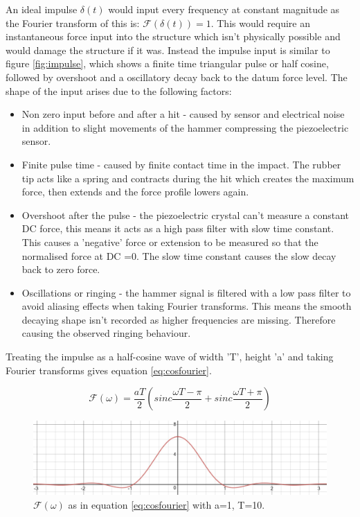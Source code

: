 \documentclass[twoside,onecolumn]{article}
\begin{document}
An ideal impulse $\delta(t)$ would input every frequency at constant magnitude as the Fourier transform of this is: $\mathcal{F}(\delta(t))=1$. This would require an instantaneous force input into the structure which isn't physically possible and would damage the structure if it was. Instead the impulse input is similar to figure \ref{fig:impulse}, which shows a finite time triangular pulse or half cosine, followed by overshoot and a oscillatory decay back to the datum force level. 
The shape of the input arises due to the following factors:
\begin{itemize}
\item Non zero input before and after a hit - caused by sensor and electrical noise in addition to slight movements of the hammer compressing the piezoelectric sensor.
\item Finite pulse time - caused by finite contact time in the impact. The rubber tip acts like a spring and contracts during the hit which creates the maximum force, then extends and the force profile lowers again.
\item Overshoot after the pulse - the piezoelectric crystal can't measure a constant DC force, this means it acts as a high pass filter with slow time constant. This causes a 'negative' force or extension to be measured so that the normalised force at DC =0. The slow time constant causes the slow decay back to zero force.
\item Oscillations or ringing - the hammer signal is filtered with a low pass filter to avoid aliasing effects when taking Fourier transforms. This means the smooth decaying shape isn't recorded as higher frequencies are missing. Therefore causing the observed ringing behaviour.
\end{itemize}

Treating the impulse as a half-cosine wave of width 'T', height 'a' and taking Fourier transforms gives equation \ref{eq:cosfourier}.

\begin{equation}
\mathcal{F}(\omega)= \frac{aT}{2}(sinc\frac{\omega T-\pi}{2} + sinc \frac{\omega T+\pi}{2})
\label{eq:cosfourier}
\end{equation}


\begin{figure}[!htb]
  \centering
    \includegraphics[width=\linewidth]{sinc}
  \caption{$\mathcal{F}(\omega)$ as in equation \ref{eq:cosfourier} with a=1, T=10.}
  \label{fig:sinc}
\end{figure}
\end{document}
